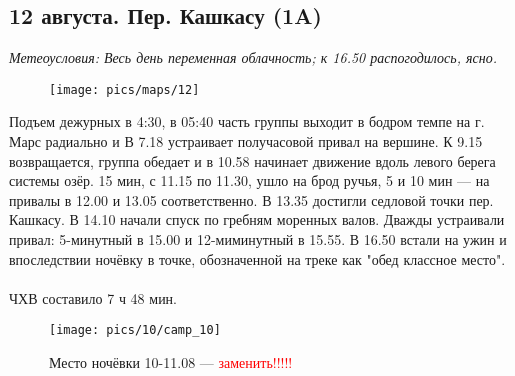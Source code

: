 \subsection{12 августа. Пер. Кашкасу (1A)}
\textit{Метеоусловия: Весь день переменная облачность; к 16.50 распогодилось, ясно.}

\begin{figure}[h!]
	\centering
	\texttt{[image: pics/maps/12]}
	\label{fig:12}
\end{figure}

Подъем дежурных в 4:30, в 05:40 часть группы выходит в бодром темпе на г. Марс радиально и В 7.18 устраивает получасовой привал на вершине. 
К 9.15 возвращается, группа обедает и в 10.58 начинает движение вдоль левого берега системы озёр. 15 мин, с 11.15 по 11.30, ушло на брод ручья,
5 и 10 мин — на привалы в 12.00 и 13.05 соответственно. В 13.35 достигли седловой точки пер. Кашкасу. В 14.10 начали спуск по гребням 
моренных валов. Дважды устраивали привал: 5-минутный в 15.00 и 12-миминутный в 15.55. В 16.50 встали на ужин и впоследствии ночёвку в точке, обозначенной на треке как 
"обед классное место". 
\\\\ ЧХВ составило 7 ч 48 мин.


\begin{figure}[h!]
	\centering
		\texttt{[image: pics/10/camp\_10]}
	\caption{Место ночёвки 10-11.08 — \textcolor{red}{заменить!!!!!}}
	\label{fig:camp_10}
\end{figure}

\clearpage

